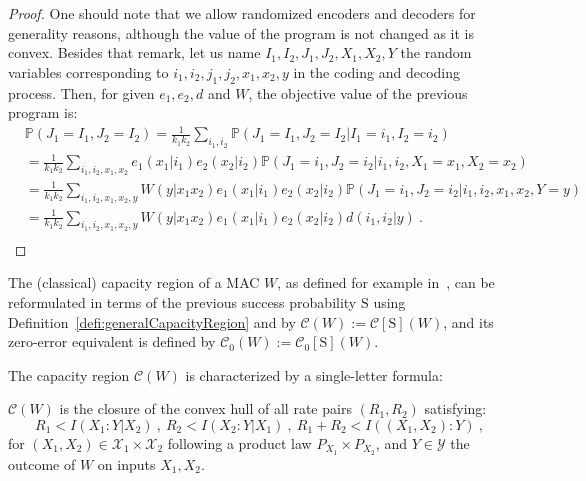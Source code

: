 \begin{proof}
One should note that we allow randomized encoders and decoders for generality reasons, although the value of the program is not changed as it is convex. Besides that remark, let us name $I_1,I_2,J_1,J_2,X_1,X_2,Y$ the random variables corresponding to $i_1,i_2,j_1,j_2,x_1,x_2,y$ in the coding and decoding process. Then, for given $e_1,e_2,d$ and $W$, the objective value of the previous program is:
\begin{equation}
  \begin{aligned}
    &\mathbb{P}\left(J_1 = I_1, J_2 = I_2\right) = \frac{1}{k_1k_2}\sum_{i_1,i_2} \mathbb{P}\left(J_1 = I_1, J_2 = I_2|I_1=i_1,I_2=i_2\right)\\
    &= \frac{1}{k_1k_2}\sum_{i_1,i_2,x_1,x_2}e_1(x_1|i_1)e_2(x_2|i_2) \mathbb{P}\left(J_1 = i_1, J_2 = i_2|i_1,i_2,X_1=x_1,X_2=x_2\right)\\
    &= \frac{1}{k_1k_2}\sum_{i_1,i_2,x_1,x_2,y}W(y|x_1x_2)e_1(x_1|i_1)e_2(x_2|i_2)\mathbb{P}\left(J_1 = i_1,J_2=i_2|i_1,i_2,x_1,x_2,Y=y\right)\\
    &= \frac{1}{k_1k_2}\sum_{i_1,i_2,x_1,x_2,y}W(y|x_1x_2)e_1(x_1|i_1)e_2(x_2|i_2)d(i_1,i_2|y) \ .\\
      \end{aligned}
\end{equation}
\end{proof}


The (classical) capacity region of a MAC $W$, as defined for example in~\cite{CT01}, can be reformulated in terms of the previous success probability $\mathrm{S}$ using Definition~\ref{defi:generalCapacityRegion} and by $\mathcal{C}(W) := \mathcal{C}[\mathrm{S}](W)$, and its zero-error equivalent is defined by $\mathcal{C}_0(W) := \mathcal{C}_0[\mathrm{S}](W)$. 

The capacity region $\mathcal{C}(W)$ is characterized by a single-letter formula:

\begin{theorem}
  \label{theo:capacity}
  $\mathcal{C}(W)$ is the closure of the convex hull of all rate pairs $(R_1,R_2)$ satisfying:
  \[ R_1 < I(X_1:Y|X_2)\ ,\ R_2 < I(X_2:Y|X_1)\ ,\ R_1+R_2 < I((X_1,X_2):Y) \ ,\]
  for $(X_1,X_2) \in \mathcal{X}_1 \times \mathcal{X}_2$ following a product law $P_{X_1} \times P_{X_2}$, and $Y \in \mathcal{Y}$ the outcome of $W$ on inputs $X_1,X_2$.
\end{theorem}

